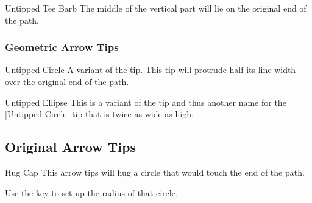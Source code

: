 \begin{multicols}{2}
\begin{arrowtipsimple}{Untipped Tee Barb}
    The middle of the vertical part will lie on the original end of the path.
\end{arrowtipsimple}

\subsubsection{Geometric Arrow Tips}
\begin{arrowtipsimple}{Untipped Circle}
    A variant of the  tip.
    This tip will protrude half its line width over the original end of the path.
\end{arrowtipsimple}

\begin{arrowtipsimple}{Untipped Ellipse}
    This is a variant of the  tip
    and thus another name for the |Untipped Circle| tip
    that is twice as wide as high.
\end{arrowtipsimple}

\subsection{Original Arrow Tips}
\begin{arrowtipsimple}{Hug Cap}
This arrow tips will hug a circle that would touch the end of the path.

Use the  key to set up the radius of that circle.

\begin{codeexample}[preamble=\usepgflibrary{ext.arrows}]
\end{codeexample}
\end{arrowtipsimple}
\end{multicols}
\tikzset{external/export/.try=true}%
\endinput
